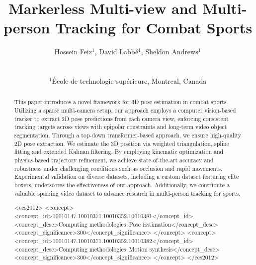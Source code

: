\documentclass{egpubl}
\title{Markerless Multi-view and Multi-person Tracking for Combat Sports}
\author[Hossein, Labbé, and Andrews]
{\parbox{\textwidth}{\centering 
        Hossein Feiz$^1$, David Labbé$^1$, Sheldon Andrews$^1$
        }
        \\
{\parbox{\textwidth}{\centering 
        $^1$École de technologie supérieure, Montreal, Canada
       }
}
}
\begin{document}

\maketitle

\begin{abstract}
   This paper introduces a novel framework for 3D pose estimation in combat sports. Utilizing a sparse multi-camera setup, our approach employs a computer vision-based tracker to extract 2D pose predictions from each camera view, enforcing consistent tracking targets across views with epipolar constraints and long-term video object segmentation. Through a top-down transformer-based approach, we ensure high-quality 2D pose extraction. We estimate the 3D position via weighted triangulation, spline fitting and extended Kalman filtering. By employing kinematic optimization and physics-based trajectory refinement, we achieve state-of-the-art accuracy and robustness under challenging conditions such as occlusion and rapid movements. Experimental validation on diverse datasets, including a custom dataset featuring elite boxers, underscores the effectiveness of our approach. Additionally, we contribute a valuable sparring video dataset to advance research in multi-person tracking for sports.


\begin{CCSXML}
<ccs2012>
<concept>
<concept_id>10010147.10010371.10010352.10010381</concept_id>
<concept_desc>Computing methodologies~Pose Estimation</concept_desc>
<concept_significance>300</concept_significance>
</concept>
<concept>
<concept_id>10010147.10010371.10010352.10010382</concept_id>
<concept_desc>Computing methodologies~Motion synthesis</concept_desc>
<concept_significance>300</concept_significance>
</concept>
</ccs2012>
\end{CCSXML}



\printccsdesc   
\end{abstract}  
\end{document}
